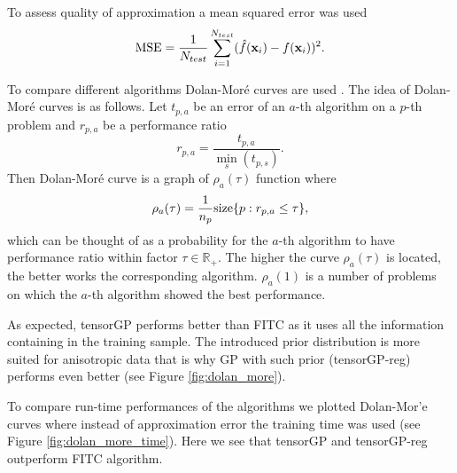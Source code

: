 To assess quality of approximation a mean squared error was used
\begin{equation}
  \label{eq:mse}
  {\rm MSE} = \frac{1}{N_{test}} \sum_{i = 1}^{N_{test}} (\hat{f}(\mathbf{x}_i) - f(\mathbf{x}_i))^2.
\end{equation}

To compare different algorithms Dolan-Mor\'{e} curves are used \citep{dolanMore}.
The idea of Dolan-Mor\'{e} curves is as follows.
Let $t_{p, a}$ be an error of an $a$-th algorithm on a $p$-th problem and $r_{p, a}$
be a performance ratio
\[
r_{p, a} = \frac{t_{p, a}} {\min\limits_s(t_{p, s})}.
\]
Then Dolan-Mor\'{e} curve is a graph of $\rho_a(\tau)$ function where
\[
\rho_a(\tau) = \frac{1}{n_p}{\rm size} \{p: r_{p, a} \le \tau \},
\]
which can be thought of as a probability for the  $a$-th algorithm to have performance
ratio within factor $\tau \in \mathbb{R}_+$.
The higher the curve $\rho_a(\tau)$ is located, the better works the corresponding algorithm.
$\rho_a(1)$ is a number of problems on which the $a$-th algorithm showed the best performance.

As expected, tensorGP performs better than FITC as it uses all the information
containing in the training sample.
The introduced prior distribution is more suited for anisotropic data that is why
GP with such prior (tensorGP-reg) performs even better (see Figure \ref{fig:dolan_more}).

To compare run-time performances of the algorithms we plotted Dolan-Mor{'e} curves
where instead of approximation error the training time was used (see Figure \ref{fig:dolan_more_time}).
Here we see that tensorGP and tensorGP-reg outperform FITC algorithm.

